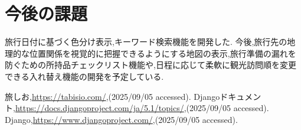 \documentclass[a4j,twocolumn]{jsarticle}
\begin{document}
\section{今後の課題}
\label{sec:org968dc1f}
旅行日付に基づく色分け表示,キーワード検索機能を開発した.
今後,旅行先の地理的な位置関係を視覚的に把握できるようにする地図の表示,旅行準備の漏れを防ぐための所持品チェックリスト機能や,日程に応じて柔軟に観光訪問順を変更できる入れ替え機能の開発を予定している.




\small\setlength\baselineskip{10pt}
\begin{thebibliography}{9}

 旅しお,\url{https://tabisio.com/},(2025/09/05 accessed).
Djangoドキュメント,\url{https://docs.djangoproject.com/ja/5.1/topics/},(2025/09/05 accessed).
Django,\url{https://www.djangoproject.com/},(2025/09/05 accessed).
\end{thebibliography}
\end{document}
